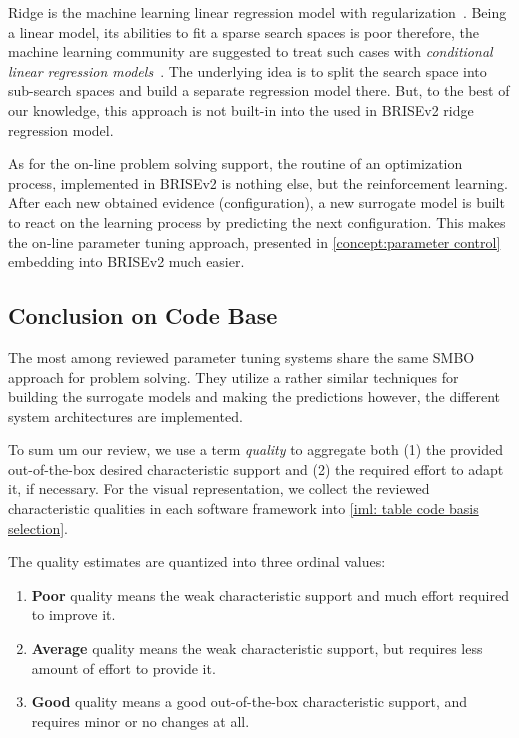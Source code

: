 Ridge is the machine learning linear regression model with regularization~\cite{hoerl1970ridge}. Being a linear model, its abilities to fit a sparse search spaces is poor therefore, the machine learning community are suggested to treat such cases with \emph{conditional linear regression models}~\cite{DBLP:journals/corr/abs-1806-02326}. The underlying idea is to split the search space into sub-search spaces and build a separate regression model there. But, to the best of our knowledge, this approach is not built-in into the used in BRISEv2 ridge regression model.

As for the on-line problem solving support, the routine of an optimization process, implemented in BRISEv2 is nothing else, but the reinforcement learning. After each new obtained evidence (configuration), a new surrogate model is built to react on the learning process by predicting the next configuration. This makes the on-line parameter tuning approach, presented in \cref{concept:parameter control} embedding into BRISEv2 much easier.

\subsection{Conclusion on Code Base}\label{impl:hlh code basis conclusion}
The most among reviewed parameter tuning systems share the same SMBO approach for problem solving. They utilize a rather similar techniques for building the surrogate models and making the predictions however, the different system architectures are implemented.

To sum um our review, we use a term \emph{quality} to aggregate both (1) the provided  out-of-the-box desired characteristic support and (2) the required effort to adapt it, if necessary. For the visual representation, we collect the reviewed characteristic qualities in each software framework into \cref{iml: table code basis selection}.

The quality estimates are quantized into three ordinal values:
\begin{enumerate}
	\item \textbf{Poor} quality means the weak characteristic support and much effort required to improve it.
	\item \textbf{Average} quality means the weak characteristic support, but requires less amount of effort to provide it.
	\item \textbf{Good} quality means a good out-of-the-box characteristic support, and requires minor or no changes at all.
\end{enumerate}

